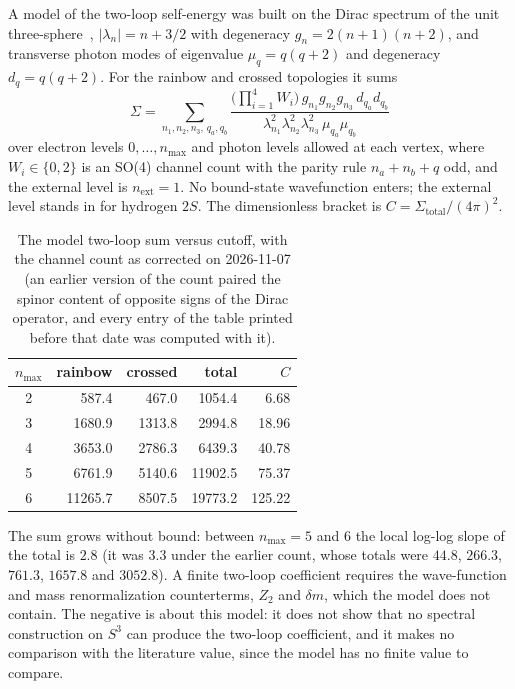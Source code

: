 \documentclass[11pt]{article}
\begin{document}
A model of the two-loop self-energy was built on the Dirac spectrum
of the unit three-sphere~\cite{camporesi_higuchi}, $|\lambda_n| = n +
3/2$ with degeneracy $g_n = 2(n+1)(n+2)$, and transverse photon modes
of eigenvalue $\mu_q = q(q+2)$ and degeneracy $d_q = q(q+2)$.  For the
rainbow and crossed topologies it sums
\begin{equation}
\Sigma = \sum_{n_1,n_2,n_3,\,q_a,q_b}
\frac{\bigl(\prod_{i=1}^{4} W_i\bigr)\, g_{n_1} g_{n_2} g_{n_3}\,
d_{q_a} d_{q_b}}
{\lambda_{n_1}^2 \lambda_{n_2}^2 \lambda_{n_3}^2\, \mu_{q_a} \mu_{q_b}}
\end{equation}
over electron levels $0, \ldots, n_\text{max}$ and photon levels
allowed at each vertex, where $W_i \in \{0, 2\}$ is an SO(4)
channel count with the parity rule $n_a + n_b + q$ odd, and the
external level is $n_\text{ext} = 1$.  No bound-state wavefunction
enters; the external level stands in for hydrogen $2S$.  The
dimensionless bracket is $C = \Sigma_\text{total}/(4\pi)^2$.

\begin{table}[ht]
\caption{The model two-loop sum versus cutoff, with the channel count
as corrected on 2026-11-07 (an earlier version of the count paired the
spinor content of opposite signs of the Dirac operator, and every
entry of the table printed before that date was computed with it).}
\label{tab:ls8a_native}
\centering
\begin{tabular}{c r r r r}
\toprule
$n_\text{max}$ & rainbow & crossed & total & $C$ \\
\midrule
2 & 587.4 & 467.0 & 1054.4 & 6.68 \\
3 & 1680.9 & 1313.8 & 2994.8 & 18.96 \\
4 & 3653.0 & 2786.3 & 6439.3 & 40.78 \\
5 & 6761.9 & 5140.6 & 11902.5 & 75.37 \\
6 & 11265.7 & 8507.5 & 19773.2 & 125.22 \\
\bottomrule
\end{tabular}
\end{table}

The sum grows without bound: between $n_\text{max} = 5$ and $6$ the
local log-log slope of the total is $2.8$ (it was $3.3$ under the
earlier count, whose totals were $44.8$, $266.3$, $761.3$, $1657.8$ and
$3052.8$).  A finite two-loop coefficient requires the
wave-function and mass renormalization counterterms, $Z_2$ and $\delta
m$, which the model does not contain.  The negative is about this
model: it does not show that no spectral construction on $S^3$ can
produce the two-loop coefficient, and it makes no comparison with the
literature value, since the model has no finite value to compare.
\end{document}
